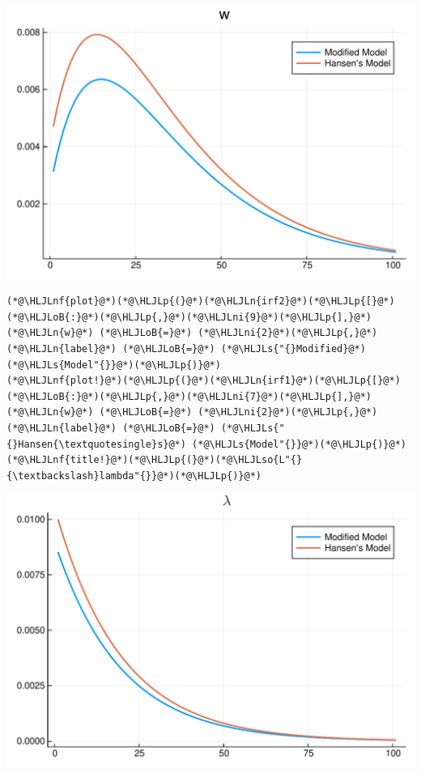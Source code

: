 \documentclass[12pt,a4paper]{article}
\newcommand{\HLJLn}[1]{#1}
\newcommand{\HLJLnf}[1]{\textcolor[RGB]{66,102,213}{#1}}
\newcommand{\HLJLs}[1]{\textcolor[RGB]{201,61,57}{#1}}
\newcommand{\HLJLso}[1]{\textcolor[RGB]{201,61,57}{#1}}
\newcommand{\HLJLni}[1]{\textcolor[RGB]{59,151,46}{#1}}
\newcommand{\HLJLoB}[1]{\textcolor[RGB]{102,102,102}{\textbf{#1}}}
\newcommand{\HLJLp}[1]{#1}
\begin{document}
\includegraphics[width=\linewidth]{figures/yvan_10_1.pdf}

\begin{lstlisting}
(*@\HLJLnf{plot}@*)(*@\HLJLp{(}@*)(*@\HLJLn{irf2}@*)(*@\HLJLp{[}@*)(*@\HLJLoB{:}@*)(*@\HLJLp{,}@*)(*@\HLJLni{9}@*)(*@\HLJLp{],}@*) (*@\HLJLn{w}@*) (*@\HLJLoB{=}@*) (*@\HLJLni{2}@*)(*@\HLJLp{,}@*) (*@\HLJLn{label}@*) (*@\HLJLoB{=}@*) (*@\HLJLs{"{}Modified}@*) (*@\HLJLs{Model"{}}@*)(*@\HLJLp{)}@*)
(*@\HLJLnf{plot!}@*)(*@\HLJLp{(}@*)(*@\HLJLn{irf1}@*)(*@\HLJLp{[}@*)(*@\HLJLoB{:}@*)(*@\HLJLp{,}@*)(*@\HLJLni{7}@*)(*@\HLJLp{],}@*) (*@\HLJLn{w}@*) (*@\HLJLoB{=}@*) (*@\HLJLni{2}@*)(*@\HLJLp{,}@*) (*@\HLJLn{label}@*) (*@\HLJLoB{=}@*) (*@\HLJLs{"{}Hansen{\textquotesingle}s}@*) (*@\HLJLs{Model"{}}@*)(*@\HLJLp{)}@*)
(*@\HLJLnf{title!}@*)(*@\HLJLp{(}@*)(*@\HLJLso{L"{}{\textbackslash}lambda"{}}@*)(*@\HLJLp{)}@*)
\end{lstlisting}

\includegraphics[width=\linewidth]{figures/yvan_11_1.pdf}
\end{document}
